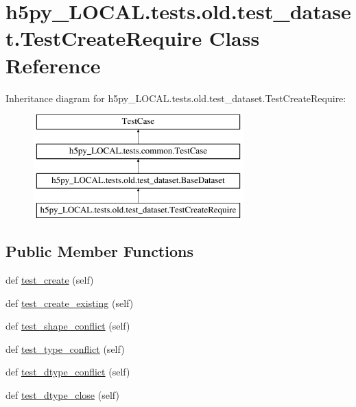 \hypertarget{classh5py__LOCAL_1_1tests_1_1old_1_1test__dataset_1_1TestCreateRequire}{}\section{h5py\+\_\+\+L\+O\+C\+A\+L.\+tests.\+old.\+test\+\_\+dataset.\+Test\+Create\+Require Class Reference}
\label{classh5py__LOCAL_1_1tests_1_1old_1_1test__dataset_1_1TestCreateRequire}
Inheritance diagram for h5py\+\_\+\+L\+O\+C\+A\+L.\+tests.\+old.\+test\+\_\+dataset.\+Test\+Create\+Require\+:\begin{figure}[H]
\begin{center}
\leavevmode
\includegraphics[height=4.000000cm]{classh5py__LOCAL_1_1tests_1_1old_1_1test__dataset_1_1TestCreateRequire}
\end{center}
\end{figure}
\subsection*{Public Member Functions}
\begin{DoxyCompactItemize}
\item 
def \hyperlink{classh5py__LOCAL_1_1tests_1_1old_1_1test__dataset_1_1TestCreateRequire_ab6a145acfe5841ea1cba60bfc9cfeafb}{test\+\_\+create} (self)
\item 
def \hyperlink{classh5py__LOCAL_1_1tests_1_1old_1_1test__dataset_1_1TestCreateRequire_afc24e7a6ee28bd6960722bca39be4148}{test\+\_\+create\+\_\+existing} (self)
\item 
def \hyperlink{classh5py__LOCAL_1_1tests_1_1old_1_1test__dataset_1_1TestCreateRequire_a8d544cabbfbb60d6e747b8fb6e2bf91a}{test\+\_\+shape\+\_\+conflict} (self)
\item 
def \hyperlink{classh5py__LOCAL_1_1tests_1_1old_1_1test__dataset_1_1TestCreateRequire_acb2cebf50793cf4d0848fde2c71915fc}{test\+\_\+type\+\_\+conflict} (self)
\item 
def \hyperlink{classh5py__LOCAL_1_1tests_1_1old_1_1test__dataset_1_1TestCreateRequire_ae7399c408f36a377beda7f6b4fb2dd00}{test\+\_\+dtype\+\_\+conflict} (self)
\item 
def \hyperlink{classh5py__LOCAL_1_1tests_1_1old_1_1test__dataset_1_1TestCreateRequire_ab140ae7801b291d3be4f762d2d4e8e15}{test\+\_\+dtype\+\_\+close} (self)
\end{DoxyCompactItemize}
